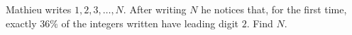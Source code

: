 Mathieu writes $1,2,3,\dots,N$. After writing $N$ he notices that, for the first time, exactly $36\%$ of the integers written have leading digit $2$. Find $N$.
